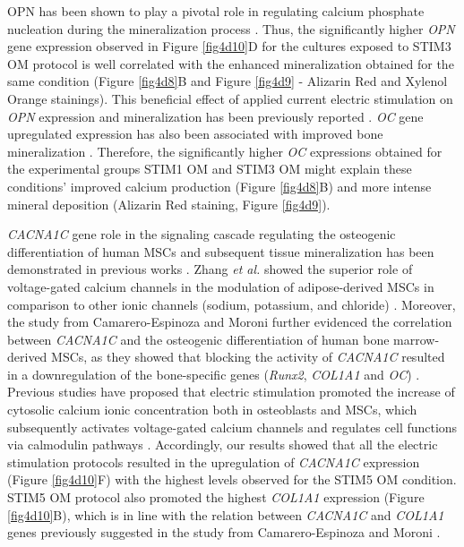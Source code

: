 OPN has been shown to play a pivotal role in regulating calcium phosphate nucleation during the mineralization process \cite{Liu2020-zx}. Thus, the significantly higher \textit{OPN} gene expression observed in Figure \ref{fig4d10}D for the cultures exposed to STIM3 OM protocol is well correlated with the enhanced mineralization obtained for the same condition (Figure \ref{fig4d8}B and Figure \ref{fig4d9} - Alizarin Red and Xylenol Orange stainings). This beneficial effect of applied current electric stimulation on \textit{OPN} expression and mineralization has been previously reported \cite{Zhang2016-ul}. \textit{OC} gene upregulated expression has also been associated with improved bone mineralization \cite{Zoch2016-bn}. Therefore, the significantly higher \textit{OC} expressions obtained for the experimental groups STIM1 OM and STIM3 OM might explain these conditions’ improved calcium production (Figure \ref{fig4d8}B) and more intense mineral deposition (Alizarin Red staining, Figure \ref{fig4d9}).

\textit{CACNA1C} gene role in the signaling cascade regulating the osteogenic differentiation of human MSCs and subsequent tissue mineralization has been demonstrated in previous works \cite{Zhang2016-ul}. Zhang \textit{et al.} showed the superior role of voltage-gated calcium channels in the modulation of adipose-derived \ac{MSCs} in comparison to other ionic channels (sodium, potassium, and chloride) \cite{Zhang2016-ul}. Moreover, the study from Camarero-Espinoza and Moroni further evidenced the correlation between \textit{CACNA1C} and the osteogenic differentiation of human bone marrow-derived \ac{MSCs}, as they showed that blocking the activity of \textit{CACNA1C} resulted in a downregulation of the bone-specific genes (\textit{Runx2}, \textit{COL1A1} and \textit{OC}) \cite{Camarero-Espinosa2021-dh}. Previous studies have proposed that electric stimulation promoted the increase of cytosolic calcium ionic concentration both in osteoblasts and \ac{MSCs}, which subsequently activates voltage-gated calcium channels and regulates cell functions via calmodulin pathways \cite{Zhang2016-ul, Zayzafoon2006-vc}. Accordingly, our results showed that all the electric stimulation protocols resulted in the upregulation of \textit{CACNA1C} expression (Figure \ref{fig4d10}F) with the highest levels observed for the STIM5 OM condition. STIM5 OM protocol also promoted the highest \textit{COL1A1} expression (Figure \ref{fig4d10}B), which is in line with the relation between \textit{CACNA1C} and \textit{COL1A1} genes previously suggested in the study from Camarero-Espinoza and Moroni \cite{Camarero-Espinosa2021-dh}.

